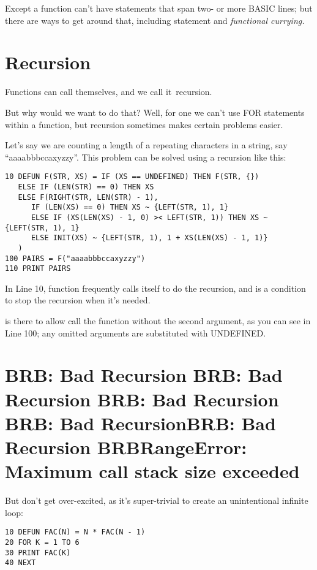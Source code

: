 \setcounter{curryingappearance}{\value{page}}
Except a function can't have statements that span two- or more BASIC lines; but there are ways to get around that, including  statement and \emph{functional currying.}

\section[Recursion]{Recursion}

Functions can call themselves, and we call it \,recursion.

But why would we want to do that? Well, for one we can't use FOR statements within a function, but recursion sometimes makes certain problems easier.

Let's say we are counting a length of a repeating characters in a string, say ``aaaabbbccaxyzzy''. This problem can be solved using a recursion like this:

\begin{lstlisting}
10 DEFUN F(STR, XS) = IF (XS == UNDEFINED) THEN F(STR, {})
   ELSE IF (LEN(STR) == 0) THEN XS
   ELSE F(RIGHT(STR, LEN(STR) - 1),
      IF (LEN(XS) == 0) THEN XS ~ {LEFT(STR, 1), 1}
      ELSE IF (XS(LEN(XS) - 1, 0) >< LEFT(STR, 1)) THEN XS ~ {LEFT(STR, 1), 1}
      ELSE INIT(XS) ~ {LEFT(STR, 1), 1 + XS(LEN(XS) - 1, 1)}
   )
100 PAIRS = F("aaaabbbccaxyzzy")
110 PRINT PAIRS
\end{lstlisting}

In Line 10, function  frequently calls itself to do the recursion, and  is a condition to stop the recursion when it's needed.

 is there to allow call the function  without the second argument, as you can see in Line 100; any omitted arguments are substituted with UNDEFINED.

\section[When Recursion Goes Wild]{BRB: Bad Recursion BRB: Bad Recursion BRB: Bad Recursion BRB: Bad RecursionBRB: Bad Recursion BRBRangeError: Maximum call stack size exceeded}

But don't get over-excited, as it's super-trivial to create an unintentional infinite loop:

\begin{lstlisting}
10 DEFUN FAC(N) = N * FAC(N - 1)
20 FOR K = 1 TO 6
30 PRINT FAC(K)
40 NEXT
\end{lstlisting}

